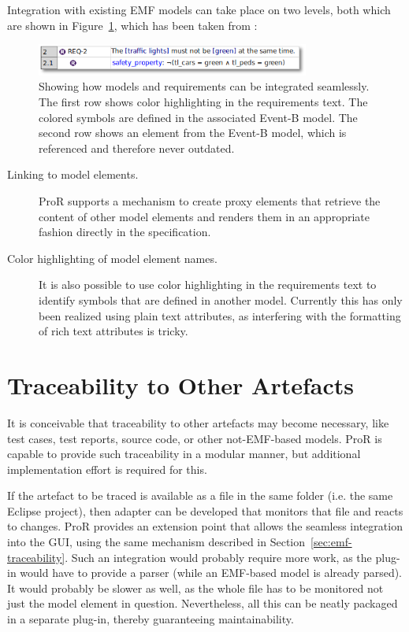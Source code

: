 \documentclass{template/openetcs_report}
\begin{document}
Integration with existing EMF models can take place on two levels, both which are shown in Figure~\ref{fig:proxy-1}, which has been taken from \cite{integrate-models}:

\begin{figure}
	\begin{center}
	\includegraphics[width=0.8\textwidth]{img/proxy-1.png}
	\end{center}
	\caption[Seamless integration of models and requirements]{Showing how models and requirements can be integrated seamlessly. The first row shows color highlighting in the requirements text.  The colored symbols are defined in the associated Event-B model.  The second row shows an element from the Event-B model, which is referenced and therefore never outdated.}
	\label{fig:proxy-1}
\end{figure} 

\begin{description}
\item[Linking to model elements.]  ProR supports a mechanism to create proxy elements that retrieve the content of other model elements and renders them in an appropriate fashion directly in the specification.
\item[Color highlighting of model element names.] It is also possible to use color highlighting in the requirements text to identify symbols that are defined in another model.  Currently this has only been realized using plain text attributes, as interfering with the formatting of rich text attributes is tricky.
\end{description}

\section{Traceability to Other Artefacts}
\label{sec:other-traceability}

It is conceivable that traceability to other artefacts may become necessary, like test cases, test reports, source code, or other not-EMF-based models.  ProR is capable to provide such traceability in a modular manner, but additional implementation effort is required for this.

If the artefact to be traced is available as a file in the same folder (i.e. the same Eclipse project), then adapter can be developed that monitors that file and reacts to changes.  ProR provides an extension point that allows the seamless integration into the GUI, using the same mechanism described in Section~\ref{sec:emf-traceability}.  Such an integration would probably require more work, as the plug-in would have to provide a parser (while an EMF-based model is already parsed).  It would probably be slower as well, as the whole file has to be monitored not just the model element in question.  Nevertheless, all this can be neatly packaged in a separate plug-in, thereby guaranteeing maintainability.
\end{document}
